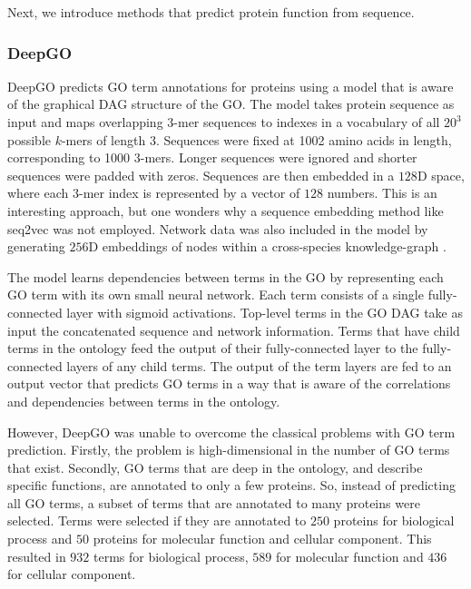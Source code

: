 Next, we introduce methods that predict protein function from sequence.

\subsubsection{DeepGO}

DeepGO \cite{Kulmanov2018} predicts GO term annotations for proteins using a model that is aware of the graphical DAG structure of the GO. The model takes protein sequence as input and maps overlapping $3$-mer sequences to indexes in a vocabulary of all $20^3$ possible $k$-mers of length $3$. Sequences were fixed at \num{1002} amino acids in length, corresponding to \num{1000} $3$-mers. Longer sequences were ignored and shorter sequences were padded with zeros. Sequences are then embedded in a $128$D space, where each $3$-mer index is represented by a vector of $128$ numbers. This is an interesting approach, but one wonders why a sequence embedding method like seq2vec was not employed. Network data was also included in the model by generating $256$D embeddings of nodes within a cross-species knowledge-graph \cite{Alshahrani2017}.

The model learns dependencies between terms in the GO by representing each GO term with its own small neural network. Each term consists of a single fully-connected layer with sigmoid activations. Top-level terms in the GO DAG take as input the concatenated sequence and network information. Terms that have child terms in the ontology feed the output of their fully-connected layer to the fully-connected layers of any child terms. The output of the term layers are fed to an output vector that predicts GO terms in a way that is aware of the correlations and dependencies between terms in the ontology.

However, DeepGO was unable to overcome the classical problems with GO term prediction. Firstly, the problem is high-dimensional in the number of GO terms that exist. Secondly, GO terms that are deep in the ontology, and describe specific functions, are annotated to only a few proteins. So, instead of predicting all GO terms, a subset of terms that are annotated to many proteins were selected. Terms were selected if they are annotated to $250$ proteins for biological process and $50$ proteins for molecular function and cellular component. This resulted in $932$ terms for biological process, $589$ for molecular function and $436$ for cellular component.

